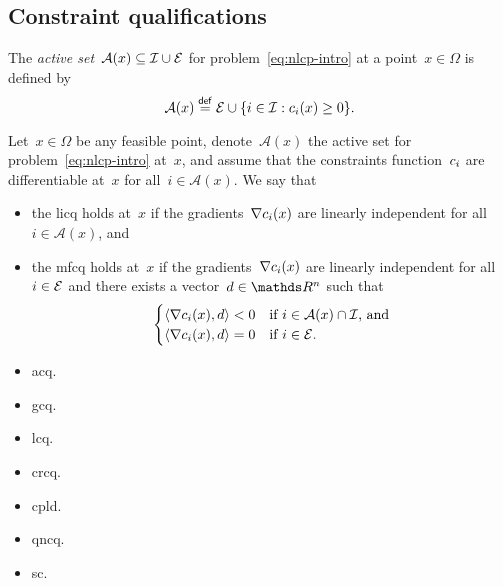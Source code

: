 \subsection{Constraint qualifications}

\begin{definition}
    The \emph{active set}~$\mathcal{A}(x) \subseteq \mathcal{I} \cup \mathcal{E}$ for problem~\cref{eq:nlcp-intro} at a point~$x \in \Omega$ is defined by
    \begin{equation*}
        \mathcal{A}(x) \mathrel{\stackrel{\mathsf{def}}{=}} \mathcal{E} \cup \{i \in \mathcal{I} : c_{i}(x) \ge 0\}.
    \end{equation*}
\end{definition}

\begin{definition}
    Let~$x \in \Omega$ be any feasible point, denote~$\mathcal{A}(x)$ the active set for problem~\cref{eq:nlcp-intro} at~$x$, and assume that the constraints function~$c_{i}$ are differentiable at~$x$ for all~$i \in \mathcal{A}(x)$.
    We say that
    \begin{itemize}
        \item the \gls{licq} holds at~$x$ if the gradients~$\nabla c_{i}(x)$ are linearly independent for all~$i \in \mathcal{A}(x)$, and
        \item the \gls{mfcq} holds at~$x$ if the gradients~$\nabla c_{i}(x)$ are linearly independent for all~$i \in \mathcal{E}$ and there exists a vector~$d \in \R^n$ such that
        \begin{equation*}
            \begin{cases}
                \langle\nabla c_{i}(x), d\rangle < 0    & \text{if~$i \in \mathcal{A}(x) \cap \mathcal{I}$, and}\\
                \langle\nabla c_{i}(x), d\rangle = 0    & \text{if~$i \in \mathcal{E}$}.
            \end{cases}
        \end{equation*}
    \end{itemize}
\end{definition}

\begin{itemize}
    \item \gls{acq}.
    \item \gls{gcq}.
    \item \gls{lcq}.
    \item \gls{crcq}.
    \item \gls{cpld}.
    \item \gls{qncq}.
    \item \gls{sc}.
\end{itemize}

